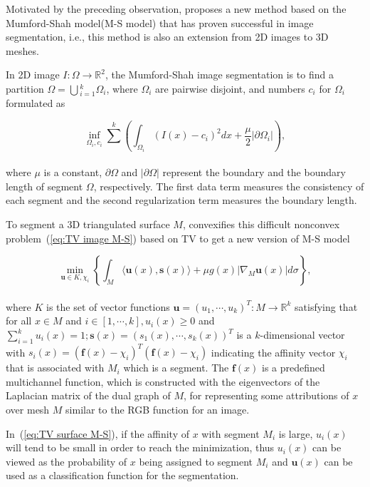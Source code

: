 Motivated by the preceding observation, \cite{zhang2012variational} proposes a new method based on the Mumford-Shah model(M-S model)\cite{mumford1989optimal} that has proven successful in image segmentation, i.e., this method is also an extension from 2D images to 3D meshes.

In 2D image $I:\Omega\rightarrow \mathbb{R}^2$, the Mumford-Shah image segmentation is to find a partition $\Omega=\bigcup{_{i=1}^{k}}\Omega_{i}$, where $\Omega_{i}$ are pairwise disjoint, and numbers $c_{i}$ for $\Omega_{i}$ formulated as

\small{
\begin{equation}
 \label{eq:TV image M-S}
 \inf_{\Omega_{i},c_{i}} \sum_{}^{k}
 ( \int_{\Omega_{i}}^{} (I(x)-c_{i})^2dx + \frac{\mu}{2} | \partial\Omega_{i} | ),
\end{equation}
}
\\
where $\mu$ is a constant, $\partial \Omega$ and $|\partial \Omega|$ represent the boundary and the boundary length of segment $\Omega$, respectively.
The first data term measures the consistency of each segment and the second regularization term measures the boundary length.

To segment a 3D triangulated surface $M$, \cite{zhang2012variational} convexifies this difficult nonconvex problem~(\ref{eq:TV image M-S}) based on TV to get a new version of M-S model

\small{
\begin{equation}
 \label{eq:TV surface M-S}
 \min_{\mathbf{u}\in K, \chi_{i}} \left \{
 \int_{M}\langle\mathbf{u}(x), \mathbf{s}(x)\rangle +
 \mu g(x)| \nabla_{M}\mathbf{u}(x) | d\sigma
 \right\},
\end{equation}
}
\\
where $K$ is the set of vector functions $\mathbf{u}=(u_1,\cdots,u_{k})^{T}:M\rightarrow \mathbb{R}^{k}$ satisfying that for all $x\in M$ and $i\in [1,\cdots,k],u_{i}(x)\geq0$ and
$\sum_{i=1}^{k}u_{i}(x)=1; \mathbf{s}(x)=(s_1(x),\cdots,s_k(x))^T$ is a $k$-dimensional vector with $s_i(x)=(\mathbf{f}(x)-\chi_{i})^{T}(\mathbf{f}(x)-\chi_{i})$ indicating
the affinity vector $\chi_{i}$ that is associated with $M_{i}$ which is a segment.
The $\mathbf{f}(x)$ is a predefined multichannel function, which is constructed with the eigenvectors of the Laplacian matrix of the dual graph of $M$, for representing some attributions of $x$ over mesh $M$ similar to the RGB function for an image.

In~(\ref{eq:TV surface M-S}), if the affinity of $x$ with segment $M_{i}$ is large, $u_{i}(x)$ will tend to be small in order to reach the minimization, thus $u_{i}(x)$ can be viewed as the probability of $x$ being assigned to segment $M_{i}$ and $\mathbf{u}(x)$ can be used as a classification function for the segmentation.

